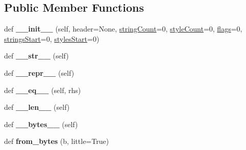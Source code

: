 \subsection*{Public Member Functions}
\begin{DoxyCompactItemize}
\item 
\mbox{\label{classarsc_1_1stringpool_1_1ResStringPool__header_a545c31a0fe0c1f99788948b0b15ebd12}} 
def {\bfseries \+\_\+\+\_\+init\+\_\+\+\_\+} (self, header=None, \mbox{\hyperlink{classarsc_1_1stringpool_1_1ResStringPool__header_a6710c34ad94738147f7c99a536973926}{string\+Count}}=0, \mbox{\hyperlink{classarsc_1_1stringpool_1_1ResStringPool__header_af4fabc8ca2933e058c76ba80f75f90b8}{style\+Count}}=0, \mbox{\hyperlink{classarsc_1_1stringpool_1_1ResStringPool__header_a66f1d4497df05a8d7e41c51c0a6e4bed}{flags}}=0, \mbox{\hyperlink{classarsc_1_1stringpool_1_1ResStringPool__header_ac34d0256d2b019be65b6eba225642af8}{strings\+Start}}=0, \mbox{\hyperlink{classarsc_1_1stringpool_1_1ResStringPool__header_a6b4e18bf84dea343ef091b7b7b6eda5a}{styles\+Start}}=0)
\item 
\mbox{\label{classarsc_1_1stringpool_1_1ResStringPool__header_ad3b3aeba65596bfc4c25ffd7e8ee09a1}} 
def {\bfseries \+\_\+\+\_\+str\+\_\+\+\_\+} (self)
\item 
\mbox{\label{classarsc_1_1stringpool_1_1ResStringPool__header_a88bdeece74644c0b839a6585f129a314}} 
def {\bfseries \+\_\+\+\_\+repr\+\_\+\+\_\+} (self)
\item 
\mbox{\label{classarsc_1_1stringpool_1_1ResStringPool__header_a05e5a8811bc35cd6b6a0aa64af95769b}} 
def {\bfseries \+\_\+\+\_\+eq\+\_\+\+\_\+} (self, rhs)
\item 
\mbox{\label{classarsc_1_1stringpool_1_1ResStringPool__header_a1883b4a6dc6f05445ed4b14f5463e7b9}} 
def {\bfseries \+\_\+\+\_\+len\+\_\+\+\_\+} (self)
\item 
\mbox{\label{classarsc_1_1stringpool_1_1ResStringPool__header_a33f4536dda45f0a3b47fa112827f4f93}} 
def {\bfseries \+\_\+\+\_\+bytes\+\_\+\+\_\+} (self)
\item 
\mbox{\label{classarsc_1_1stringpool_1_1ResStringPool__header_a63f4a1617da7a16a70420b50be46c8a5}} 
def {\bfseries from\+\_\+bytes} (b, little=True)
\end{DoxyCompactItemize}
